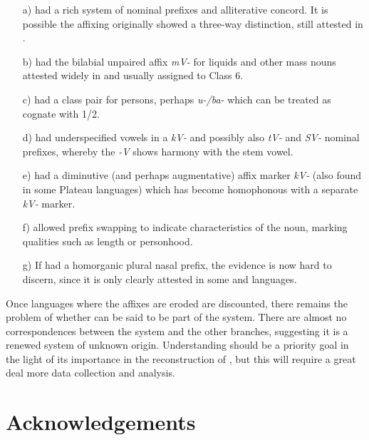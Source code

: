 \documentclass[output=paper]{langsci/langscibook}
\begin{document}
\begin{enumerate}
\item[a)]  had a rich system of nominal prefixes and alliterative concord. It is possible the affixing originally showed a three-way distinction, still attested in .
\item[b)]  had the bilabial unpaired affix \textit{mV-} for liquids and other mass nouns attested widely in  and usually assigned to Class 6.
\item[c)]  had a class pair for persons, perhaps \textit{u-/ba-} which can be treated as cognate with  1/2.
\item[d)]  had underspecified vowels in a \textit{kV-} and possibly also \textit{tV-} and \textit{SV-} nominal prefixes, whereby the \textit{-V} shows harmony with the stem vowel.
\item[e)]  had a diminutive (and perhaps augmentative) affix marker \textit{kV-} (also found in some Plateau languages) which has become homophonous with a separate \textit{kV-} marker.
\sloppy
\item[f)]  allowed prefix swapping to indicate characteristics of the noun, marking qualities such as length or personhood.
\fussy
\item[g)] If  had a homorganic plural nasal prefix, the evidence is now hard to discern, since it is only clearly attested in some  and  languages.
\end{enumerate}

Once languages where the affixes are eroded are discounted, there remains the problem of whether  can be said to be part of the system. There are almost no correspondences between the  system and the other branches, suggesting it is a renewed system of unknown origin. Understanding  should be a priority goal in the light of its importance in the reconstruction of , but this will require a great deal more data collection and analysis.

\section*{Acknowledgements}
\end{document}

